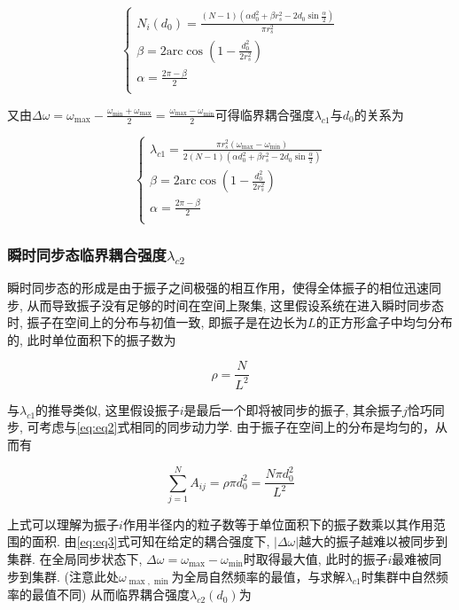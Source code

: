 \documentclass{article}
\begin{document}
$$
\begin{cases}
	N_i\left( d_0 \right) =\frac{\left( N-1 \right) \left( \alpha d_{0}^{2}+\beta r_{s}^{2}-2d_0\sin \frac{\alpha}{2} \right)}{\pi r_{s}^{2}}\\
	\beta =2\mathrm{arc}\cos \left( 1-\frac{d_{0}^{2}}{2r_{s}^{2}} \right)\\
	\alpha =\frac{2\pi -\beta}{2}\\
\end{cases}
$$

又由$\Delta \omega =\omega _{\max}-\frac{\omega _{\min}+\omega _{\max}}{2}=\frac{\omega _{\max}-\omega _{\min}}{2}$可得临界耦合强度$\lambda _{c1}$与$d_0$的关系为

$$
\begin{cases}
	\lambda _{c1}=\frac{\pi r_{s}^{2}\left( \omega _{\max}-\omega _{\min} \right)}{2\left( N-1 \right) \left( \alpha d_{0}^{2}+\beta r_{s}^{2}-2d_0\sin \frac{\alpha}{2} \right)}\\
	\beta =2\mathrm{arc}\cos \left( 1-\frac{d_{0}^{2}}{2r_{s}^{2}} \right)\\
	\alpha =\frac{2\pi -\beta}{2}\\
\end{cases}
$$

\subsubsection{瞬时同步态临界耦合强度$\lambda_{c2}$}

瞬时同步态的形成是由于振子之间极强的相互作用，使得全体振子的相位迅速同步, 从而导致振子没有足够的时间在空间上聚集, 这里假设系统在进入瞬时同步态时, 振子在空间上的分布与初值一致, 即振子是在边长为$L$的正方形盒子中均匀分布的, 此时单位面积下的振子数为

\begin{equation}
	\rho =\frac{N}{L^{2}}
\end{equation}

与$\lambda_{c1}$的推导类似, 这里假设振子$i$是最后一个即将被同步的振子, 其余振子$j$恰巧同步, 可考虑与\ref{eq:eq2}式相同的同步动力学. 由于振子在空间上的分布是均匀的，从而有

$$
\sum_{j=1}^N{A_{ij}}=\rho \pi d_{0}^{2}=\frac{N\pi d_{0}^{2}}{L^2}
$$

上式可以理解为振子$i$作用半径内的粒子数等于单位面积下的振子数乘以其作用范围的面积. 由\ref{eq:eq3}式可知在给定的耦合强度下, $\left| \Delta \omega \right|$越大的振子越难以被同步到集群. 在全局同步状态下, $\Delta \omega =\omega _{\max}-\omega _{\min}$时取得最大值, 此时的振子$i$最难被同步到集群. (注意此处$\omega _{\max, \min}$为全局自然频率的最值，与求解$\lambda_{c1}$时集群中自然频率的最值不同)
从而临界耦合强度$\lambda_{c2}(d_0)$为
\end{document}
